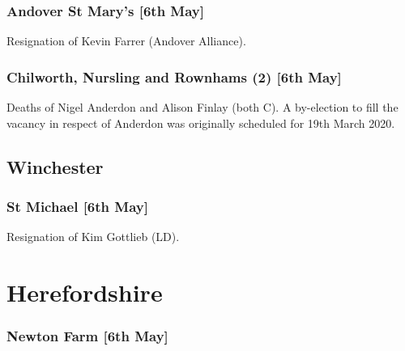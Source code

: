 \documentclass[a4paper,openany]{book}
\begin{document}
\begin{resultsiii}
\subsubsection*{Andover St Mary's \hspace*{\fill}\nolinebreak[1]%
	\enspace\hspace*{\fill}
	[6th May]}


Resignation of Kevin Farrer (Andover Alliance).

\subsubsection*{Chilworth, Nursling and Rownhams (2) \hspace*{\fill}\nolinebreak[1]%
	\enspace\hspace*{\fill}
	[6th May]}


Deaths of Nigel Anderdon and Alison Finlay (both C).  A by-election to fill the vacancy in respect of Anderdon was originally scheduled for 19th March 2020.

\subsection*{Winchester}

\subsubsection*{St Michael \hspace*{\fill}\nolinebreak[1]%
	\enspace\hspace*{\fill}
	[6th May]}


Resignation of Kim Gottlieb (LD).

\section{Herefordshire}

\subsubsection*{Newton Farm \hspace*{\fill}\nolinebreak[1]%
	\enspace\hspace*{\fill}
	[6th May]}


\end{resultsiii}
\end{document}
